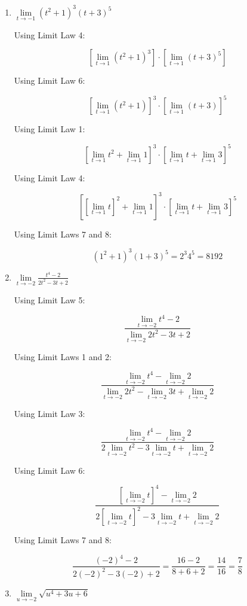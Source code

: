 \documentclass{article}
\begin{document}
\begin{enumerate}
		\item $\lim \limits _{t \to -1} (t^2 + 1)^3 (t + 3)^5$
		
			Using Limit Law 4:
			
			$$[\lim \limits _{t \to 1} (t^2 + 1)^3] \cdot [\lim \limits _{t \to 1} (t + 3)^5]$$
			
			Using Limit Law 6:
			
			$$[\lim \limits _{t \to 1} (t^2 + 1)]^3 \cdot [\lim \limits _{t \to 1} (t + 3)]^5$$
			
			Using Limit Law 1:
			
			$$[\lim \limits _{t \to 1} t^2 + \lim \limits _{t \to 1} 1]^3 \cdot [\lim \limits _{t \to 1} t + \lim \limits _{t \to 1} 3]^5$$
			
			Using Limit Law 4:
			
			$$[[\lim \limits _{t \to 1} t]^2 + \lim \limits _{t \to 1} 1]^3 \cdot [\lim \limits _{t \to 1} t + \lim \limits _{t \to 1} 3]^5$$
			
			Using Limit Laws 7 and 8:
			
			$$(1^2 + 1)^3 (1 + 3)^5 = 2^3 4^5 = 8192$$
			
		\item $\lim \limits _{t \to -2} \frac{t^4 - 2}{2t^2 - 3t + 2}$
		
			Using Limit Law 5:
			
			$$\frac{\lim \limits _{t \to -2} t^4 - 2}{\lim \limits _{t \to -2} 2t^2 -3t +2}$$
		
			Using Limit Laws 1 and 2:
			
			$$\frac{\lim \limits _{t \to -2} t^4 - \lim \limits _{t \to -2} 2}
			{\lim \limits _{t \to -2} 2t^2 - \lim \limits _{t \to -2} 3t + \lim \limits _{t \to -2} 2}$$
			
			Using Limit Law 3:
			
			$$\frac{\lim \limits _{t \to -2} t^4 - \lim \limits _{t \to -2} 2}
			{2 \lim \limits _{t \to -2} t^2 - 3 \lim \limits _{t \to -2} t + \lim \limits _{t \to -2} 2}$$
			
			Using Limit Law 6:
			
			$$\frac{[\lim \limits _{t \to -2} t]^4 - \lim \limits _{t \to -2} 2}
			{2 [\lim \limits _{t \to -2} t]^2 - 3 \lim \limits _{t \to -2} t + \lim \limits _{t \to -2} 2}$$
			
			Using Limit Laws 7 and 8:
			
			$$\frac{(-2)^4 -  2}{2(-2)^2 - 3(-2) +  2} = \frac{16 -2}{8 + 6 + 2} = \frac{14}{16} = \frac{7}{8}$$
			
		\item $\lim \limits _{u \to -2} \sqrt{u^4 + 3u + 6}$
		

\end{enumerate}
\end{document}
